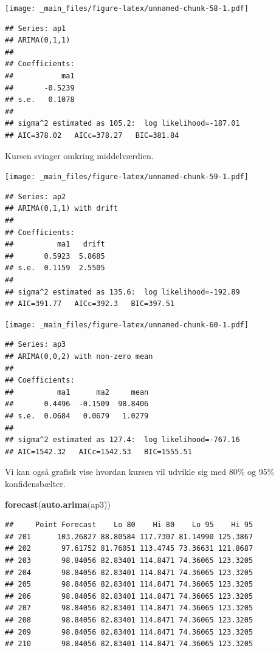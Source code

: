 \documentclass[]{book}
\newenvironment{Shaded}{\begin{snugshade}}{\end{snugshade}}
\newcommand{\KeywordTok}[1]{\textcolor[rgb]{0.13,0.29,0.53}{\textbf{#1}}}
\newcommand{\NormalTok}[1]{#1}
\begin{document}
\texttt{[image: \_main\_files/figure-latex/unnamed-chunk-58-1.pdf]}

\begin{verbatim}
## Series: ap1 
## ARIMA(0,1,1) 
## 
## Coefficients:
##           ma1
##       -0.5239
## s.e.   0.1078
## 
## sigma^2 estimated as 105.2:  log likelihood=-187.01
## AIC=378.02   AICc=378.27   BIC=381.84
\end{verbatim}

Kursen svinger omkring middelværdien.

\texttt{[image: \_main\_files/figure-latex/unnamed-chunk-59-1.pdf]}

\begin{verbatim}
## Series: ap2 
## ARIMA(0,1,1) with drift 
## 
## Coefficients:
##          ma1   drift
##       0.5923  5.8685
## s.e.  0.1159  2.5505
## 
## sigma^2 estimated as 135.6:  log likelihood=-192.89
## AIC=391.77   AICc=392.3   BIC=397.51
\end{verbatim}

\texttt{[image: \_main\_files/figure-latex/unnamed-chunk-60-1.pdf]}

\begin{verbatim}
## Series: ap3 
## ARIMA(0,0,2) with non-zero mean 
## 
## Coefficients:
##          ma1      ma2     mean
##       0.4496  -0.1509  98.8406
## s.e.  0.0684   0.0679   1.0279
## 
## sigma^2 estimated as 127.4:  log likelihood=-767.16
## AIC=1542.32   AICc=1542.53   BIC=1555.51
\end{verbatim}

Vi kan også grafisk vise hvordan kursen vil udvikle sig med 80\% og 95\% konfidensbælter.

\begin{Shaded}
\begin{Highlighting}[]
\KeywordTok{forecast}\NormalTok{(}\KeywordTok{auto.arima}\NormalTok{(ap3))}
\end{Highlighting}
\end{Shaded}

\begin{verbatim}
##     Point Forecast    Lo 80    Hi 80    Lo 95    Hi 95
## 201      103.26827 88.80584 117.7307 81.14990 125.3867
## 202       97.61752 81.76051 113.4745 73.36631 121.8687
## 203       98.84056 82.83401 114.8471 74.36065 123.3205
## 204       98.84056 82.83401 114.8471 74.36065 123.3205
## 205       98.84056 82.83401 114.8471 74.36065 123.3205
## 206       98.84056 82.83401 114.8471 74.36065 123.3205
## 207       98.84056 82.83401 114.8471 74.36065 123.3205
## 208       98.84056 82.83401 114.8471 74.36065 123.3205
## 209       98.84056 82.83401 114.8471 74.36065 123.3205
## 210       98.84056 82.83401 114.8471 74.36065 123.3205
\end{verbatim}
\end{document}
